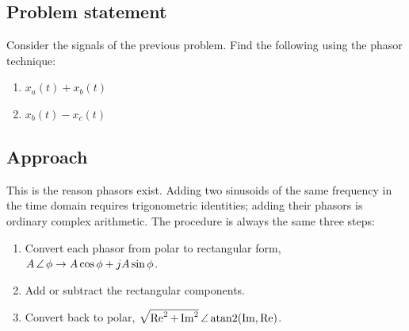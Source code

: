 





\subsection*{Problem statement}

Consider the signals of the previous problem. Find the following using the
phasor technique:
\begin{enumerate}
  \item $x_a(t) + x_b(t)$
  \item $x_b(t) - x_c(t)$
\end{enumerate}

\subsection*{Approach}

This is the reason phasors exist. Adding two sinusoids of the same frequency in
the time domain requires trigonometric identities; adding their phasors is
ordinary complex arithmetic. The procedure is always the same three steps:

\begin{enumerate}
  \item Convert each phasor from polar to rectangular form,
    $A\,\angle\,\mathord{\phi} \to A\cos\phi + jA\sin\phi$.
  \item Add or subtract the rectangular components.
  \item Convert back to polar, $\sqrt{\operatorname{Re}^2+\operatorname{Im}^2}\,\angle\,\mathord{\operatorname{atan2}(\operatorname{Im},\operatorname{Re})}$.
\end{enumerate}

